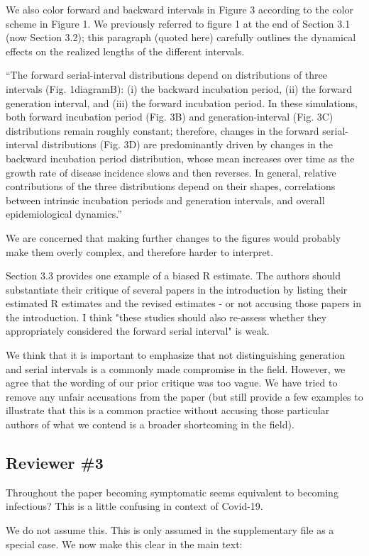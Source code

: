 \documentclass[12pt]{article}
\newcommand{\rev}{\subsection*}
\newcommand{\revtext}{\textsf}
\begin{document}
We also color forward and backward intervals in Figure 3 according to the color scheme in Figure 1.
We previously referred to figure 1 at the end of Section 3.1 (now Section 3.2); this paragraph (quoted here) carefully outlines the dynamical effects on the realized lengths of the different intervals.

``The forward serial-interval distributions depend on distributions of three intervals
(Fig. 1{diagram}B): (i) the backward incubation period, (ii) the forward generation interval, and (iii) the forward incubation period.
In these simulations, both forward incubation period (Fig. 3B) and generation-interval (Fig. 3C) distributions remain roughly constant;
therefore, changes in the forward serial-interval distributions (Fig. 3D) are predominantly driven by changes in the backward incubation period distribution, whose mean increases over time as the growth rate of disease incidence slows and then reverses.
In general, relative contributions of the three distributions depend on their shapes, correlations between intrinsic incubation periods and generation intervals, and overall epidemiological dynamics.''

We are concerned that making further changes to the figures would probably make them overly complex, and therefore harder to interpret.

\revtext{Section 3.3 provides one example of a biased R estimate. The authors should substantiate their critique of several papers in the introduction by listing their estimated R estimates and the revised estimates - or not accusing those papers in the introduction. I think "these studies should also re-assess whether they appropriately considered the forward serial interval" is weak.}

We think that it is important to emphasize that not distinguishing generation and serial intervals is a commonly made compromise in the field. 
However, we agree that the wording of our prior critique was too vague.
We have tried to remove any unfair accusations from the paper (but still provide a few examples to illustrate that this is a common practice without accusing those particular authors of what we contend is a broader shortcoming in the field).

\rev{Reviewer \#3}

\revtext{Throughout the paper becoming symptomatic seems equivalent to becoming infectious? This is a little confusing in context of Covid-19.}

We do not assume this. This is only assumed in the supplementary file as a special case. We now make this clear in the main text:
\end{document}
